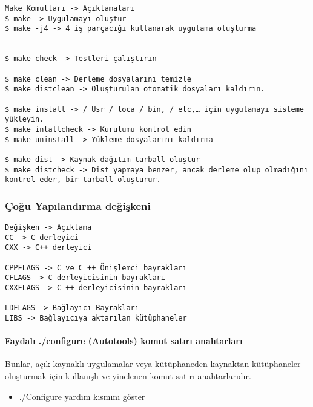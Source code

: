 \documentclass[
]{book}
\providecommand{\tightlist}{%
  \setlength{\itemsep}{0pt}\setlength{\parskip}{0pt}}
\begin{document}
\begin{verbatim}
Make Komutları -> Açıklamaları
$ make -> Uygulamayı oluştur
$ make -j4 -> 4 iş parçacığı kullanarak uygulama oluşturma

 	 
$ make check -> Testleri çalıştırın
 	 
$ make clean -> Derleme dosyalarını temizle
$ make distclean -> Oluşturulan otomatik dosyaları kaldırın.
 	 
$ make install -> / Usr / loca / bin, / etc,… için uygulamayı sisteme yükleyin.
$ make intallcheck -> Kurulumu kontrol edin
$ make uninstall -> Yükleme dosyalarını kaldırma
 	 
$ make dist -> Kaynak dağıtım tarball oluştur
$ make distcheck -> Dist yapmaya benzer, ancak derleme olup olmadığını kontrol eder, bir tarball oluşturur.
\end{verbatim}

\hypertarget{uxe7oux11fu-yapux131landux131rma-deux11fiux15fkeni}{%
\subsubsection{Çoğu Yapılandırma değişkeni}\label{uxe7oux11fu-yapux131landux131rma-deux11fiux15fkeni}}

\begin{verbatim}
Değişken -> Açıklama
CC -> C derleyici	 
CXX -> C++ derleyici	 
 	 	 
CPPFLAGS -> C ve C ++ Önişlemci bayrakları	 
CFLAGS -> C derleyicisinin bayrakları
CXXFLAGS -> C ++ derleyicisinin bayrakları 
 	 	 
LDFLAGS -> Bağlayıcı Bayrakları 
LIBS -> Bağlayıcıya aktarılan kütüphaneler
\end{verbatim}

\hypertarget{faydalux131-.configure-autotools-komut-satux131rux131-anahtarlarux131}{%
\paragraph{Faydalı ./configure (Autotools) komut satırı anahtarları}\label{faydalux131-.configure-autotools-komut-satux131rux131-anahtarlarux131}}

Bunlar, açık kaynaklı uygulamalar veya kütüphaneden kaynaktan kütüphaneler oluşturmak için kullanışlı ve yinelenen komut satırı anahtarlarıdır.

\begin{itemize}
\tightlist
\item
  ./Configure yardım kısmını göster
\end{itemize}
\end{document}
